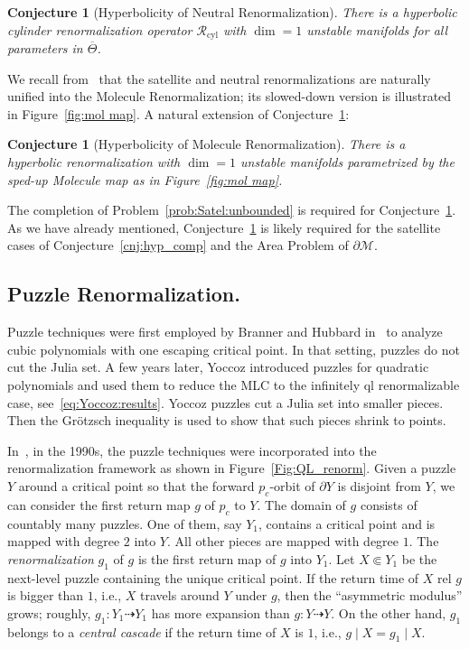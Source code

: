 \documentclass[twoside,leqno]{article}
\theoremstyle{plain}
\newtheorem{conj}[thm]{Conjecture}
\newcommand{\cyl}{{\operatorname{cyl}}}
\newcommand\MM{{\mathcal{M}}}
\newcommand{\ovlTheta}{{\overline \Theta}}
\newcommand{\RR}{{\mathcal R}}
\begin{document}

\begin{conj}[Hyperbolicity of Neutral Renormalization]\label{conj:hyp:neutral} There is a hyperbolic cylinder renormalization operator $\RR_\cyl$ with $\dim=1$ unstable manifolds for all parameters in $\ovlTheta$.
\end{conj}

 We recall from~\cite[Appendix C]{DLS} that the satellite and neutral renormalizations are naturally unified into the Molecule Renormalization; its slowed-down version is illustrated in Figure~\ref{fig:mol map}. A natural extension of Conjecture~\ref{conj:hyp:neutral}:

\begin{conj}[Hyperbolicity of Molecule Renormalization]\label{conj:hyp:Molecule} There is a hyperbolic renormalization with $\dim=1$ unstable manifolds parametrized by the sped-up Molecule map as in Figure~\ref{fig:mol map}.
\end{conj}
The completion of Problem~\ref{prob:Satel:unbounded} is required for Conjecture~\ref{conj:hyp:Molecule}. As we have already mentioned, Conjecture~\ref{conj:hyp:Molecule} is likely required for the satellite cases of Conjecture~\ref{cnj:hyp_comp} and the Area Problem of $\partial \MM$.









\subsection{Puzzle Renormalization.} \label{ss:puzzleRegime} 
Puzzle techniques were first employed by Branner and Hubbard in~\cite{BrHub} to analyze cubic polynomials with one escaping critical point. In that setting, puzzles do not cut the Julia set. A few years later, Yoccoz introduced puzzles for quadratic polynomials and used them to reduce the MLC to the infinitely ql renormalizable case, see~\eqref{eq:Yoccoz:results}. Yoccoz puzzles cut a Julia set into smaller pieces. Then the Gr\"otzsch inequality is used to show that such pieces shrink to points.

In~\cite{LyuActa,L:Parap}, in the 1990s, the puzzle techniques were incorporated into the renormalization framework as shown in Figure~\ref{Fig:QL_renorm}. Given a puzzle $Y$ around a critical point so that the forward $p_c$-orbit of $\partial Y$ is disjoint from $Y$, we can consider the first return map $g$ of $p_c$ to $Y$. The domain of $g$ consists of countably many puzzles. One of them, say $Y_1$, contains a critical point and is mapped with degree $2$ into $Y$. All other pieces are mapped with degree $1$. The \emph{renormalization} $g_1$ of $g$ is the first return map of $g$ into $Y_1$. Let $X\Subset Y_1$ be the next-level puzzle containing the unique critical point. If the return time of $X$ rel $g$ is bigger than $1$, i.e., $X$ travels around $Y$ under $g$, then the ``asymmetric modulus'' grows; roughly, $g_1\colon Y_1\dashrightarrow Y_1$ has more expansion than $g\colon Y\dashrightarrow Y$. On the other hand, $g_1$ belongs to a \emph{central cascade} if the return time of $X$ is $1$, i.e., $g\mid X=g_1\mid X$.
\end{document}
